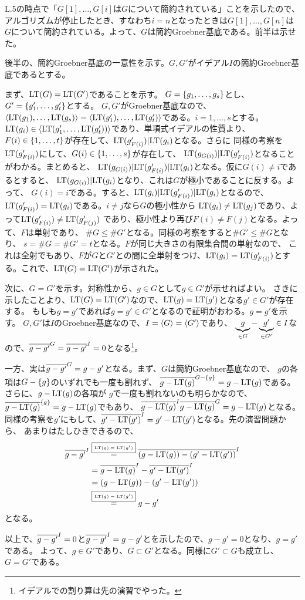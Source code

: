 \documentclass[9pt]{ltjsarticle}
\begin{document}
\begin{myproof}
L.5の時点で「$G[1],\dots,G[i]$は$G$について簡約されている」ことを示したので、
アルゴリズムが停止したとき、すなわち$i=n$となったときは$G[1],\dots,G[n]$は$G$について簡約されている。よって、$G$は簡約Groebner基底である。前半は示せた。

後半の、簡約Groebner基底の一意性を示す。$G,G'$がイデアル$I$の簡約Groebner基底であるとする。

まず、${\rm LT}(G) = {\rm LT}(G')$であることを示す。
$G=\left\{g_1,\dots,g_s\right\}$とし、$G'=\left\{g_1',\dots,g_t'\right\}$とする。
$G,G'$がGroebner基底なので、$\left\langle {\rm LT}(g_1),\dots,{\rm LT}(g_s) \right\rangle = \left\langle {\rm LT}(g_1'),\dots,{\rm LT}(g_t') \right\rangle$である。$i=1,\dots,s$とする。
${\rm LT}(g_i) \in \left\langle {\rm LT}(g_1',\dots,{\rm LT}(g_t')) \right\rangle$であり、単項式イデアルの性質より、
$F(i) \in \left\{1,\dots,t\right\}$が存在して、${\rm LT}(g_{F(i)}')|{\rm LT}(g_i)$となる。さらに
同様の考察を${\rm LT}(g'_{F(i)})$にして、$G(i)\in \left\{1,\dots,s\right\}$が存在して、
${\rm LT}(g_{G(i)})|{\rm LT}(g_{F(i)}')$となることがわかる。まとめると、
${\rm LT}(g_{G(i)})|{\rm LT}(g_{F(i)}')|{\rm LT}(g_{i})$となる。仮に$G(i)\neq i$であるとすると、
${\rm LT}(g_{G(i)})|{\rm LT}(g_i)$となり、これは$G$が極小であることに反する。よって、
$G(i)=i$である。すると、${\rm LT}(g_i)|{\rm LT}(g'_{F(i)})|{\rm LT}(g_i)$となるので、
${\rm LT}(g'_{F(i)})  = {\rm LT}(g_i)$である。$i\neq j$なら$G$の極小性から
${\rm LT}(g_i) \neq {\rm LT}( g_j)$であり、よって${\rm LT}(g'_{F(i)})\neq {\rm LT}(g'_{F(j)})$
であり、極小性より再び$F(i) \neq F(j)$となる。よって、$F$は単射であり、
$\# G \le \# G'$となる。同様の考察をすると$\# G' \le \# G$となり、
$s = \# G = \# G' = t$となる。$F$が同じ大きさの有限集合間の単射なので、
これは全射でもあり、$F$が$G$と$G'$との間に全単射をつけ、${\rm LT}(g_i) = {\rm LT}(g'_{F(i)})$とする。これで、${\rm LT}(G) = {\rm LT}(G')$が示された。

次に、$G=G'$を示す。対称性から、$g\in G$として$g\in G'$が示せればよい。
さきに示したことより、${\rm LT}(G) = {\rm LT}(G')$なので、${\rm LT}(g) = {\rm LT}(g')$となる$g' \in G'$が存在する。
もしも$g=g'$であれば$g  = g' \in G'$となるので証明がおわる。$g=g'$を示す。
$G,G'$は$I$のGroebner基底なので、$I=\left\langle G \right\rangle=\left\langle G' \right\rangle$であり、
$\underbrace{g}_{\in G}-\underbrace{g'}_{\in G'} \in I$なので、$\overline{g-g'}^{G} = \overline{g-g'}^{I} = 0$となる\footnote{イデアルでの割り算は先の演習でやった。}。

一方、実は$\overline{g-g'}^{G}=g-g'$となる。まず、$G$は簡約Groebner基底なので、
$g$の各項は$G-\left\{g\right\}$のいずれでも一度も割れず、
$\overline{g-{\rm LT}(g)}^{G-\left\{g\right\}} = g-{\rm LT}(g)$である。さらに、$g-{\rm LT}(g)$の各項が
$g$で一度も割れないのも明らかなので、$\overline{g-{\rm LT}(g)}^{\left\{g\right\}} = g-{\rm LT}(g)$でもあり、
$\overline{g-{\rm LT}(g)}^{I} \overline{g-{\rm LT}(g)}^{G} = g-{\rm LT}(g)$となる。
同様の考察を$g'$にもして、$\overline{g'-{\rm LT}(g')}^{I} = g'-{\rm LT}(g')$となる。先の演習問題から、
あまりはたしひきできるので、
\begin{align}
  \overline{g-g'}^{I}
  &\overset{\text{\fbox{\tiny ${\rm LT}(g)={\rm LT}(g')$}}}{=}
  \overline{(g-{\rm LT}(g))-(g'-{\rm LT}(g'))}^{I}\\
  &=
  \overline{g-{\rm LT}(g)}^{I} - \overline{g'-{\rm LT}(g')}^{I}\\
  &=
  (g-{\rm LT}(g)) - (g'-{\rm LT}(g'))\\
  &\overset{\text{\fbox{\tiny ${\rm LT}(g)={\rm LT}(g')$}}}{=}
  g-g'
\end{align}
となる。

以上で、$\overline{g-g'}^{I}=0$と$\overline{g-g'}^{I}=g-g'$とを示したので、$g-g'=0$となり、$g=g'$である。
よって、$g\in G'$であり、$G\subset G'$となる。同様に$G'\subset G$も成立し、$G=G'$である。
\end{myproof}
\end{document}
